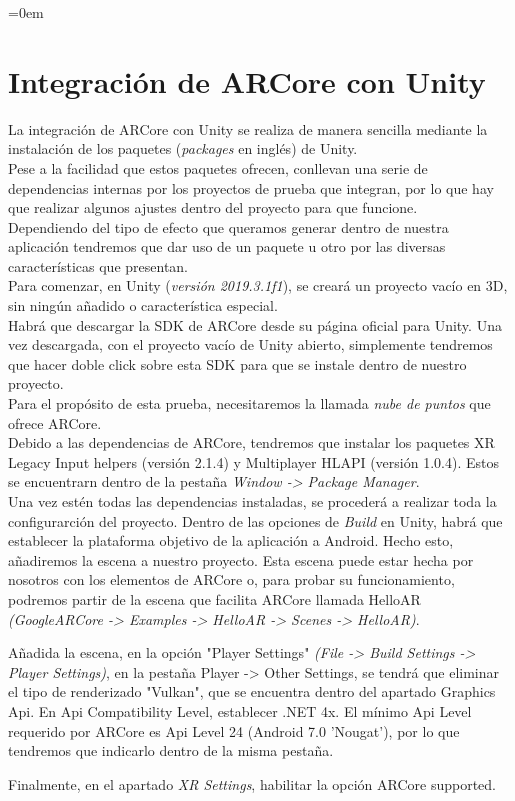 \parindent=0em
\section{Integración de ARCore con Unity}
\noindent

La integración de ARCore con Unity se realiza de manera sencilla mediante la instalación de los paquetes (\textit{packages} en inglés) de Unity.\\

Pese a la facilidad que estos paquetes ofrecen, conllevan una serie de dependencias internas por los proyectos de prueba que integran, por lo que hay que realizar algunos ajustes dentro del proyecto para que funcione.\\

Dependiendo del tipo de efecto que queramos generar dentro de nuestra aplicación tendremos que dar uso de un paquete u otro por las diversas características que presentan.\\

Para comenzar, en Unity (\textit{versión 2019.3.1f1}), se creará un proyecto vacío en 3D, sin ningún añadido o característica especial.\\

Habrá que descargar la SDK de ARCore desde su página oficial para Unity. Una vez descargada, con el proyecto vacío de Unity abierto, simplemente tendremos que hacer doble click sobre esta SDK para que se instale dentro de nuestro proyecto.\\

Para el propósito de esta prueba, necesitaremos la llamada \textit{nube de puntos} que ofrece ARCore.\\

Debido a las dependencias de ARCore, tendremos que instalar los paquetes XR Legacy Input helpers (versión 2.1.4) y Multiplayer HLAPI (versión 1.0.4). Estos se encuentrarn dentro de la pestaña \textit{Window -> Package Manager}.\\

Una vez estén todas las dependencias instaladas, se procederá a realizar toda la configurarción del proyecto. Dentro de las opciones de \textit{Build} en Unity, habrá que establecer la plataforma objetivo de la aplicación a Android. Hecho esto, añadiremos la escena a nuestro proyecto. Esta escena puede estar hecha por nosotros con los elementos de ARCore o, para probar su funcionamiento, podremos partir de la escena que facilita ARCore llamada HelloAR \textit{(GoogleARCore -> Examples -> HelloAR -> Scenes -> HelloAR)}.

Añadida la escena, en la opción "Player Settings" \textit{(File -> Build Settings -> Player Settings)}, en la pestaña Player -> Other Settings, se tendrá que eliminar el tipo de renderizado "Vulkan", que se encuentra dentro del apartado Graphics Api. En Api Compatibility Level, establecer .NET 4x. El mínimo Api Level requerido por ARCore es Api Level 24 (Android 7.0 'Nougat'), por lo que tendremos que indicarlo dentro de la misma pestaña.

Finalmente, en el apartado \textit{XR Settings}, habilitar la opción ARCore supported.
